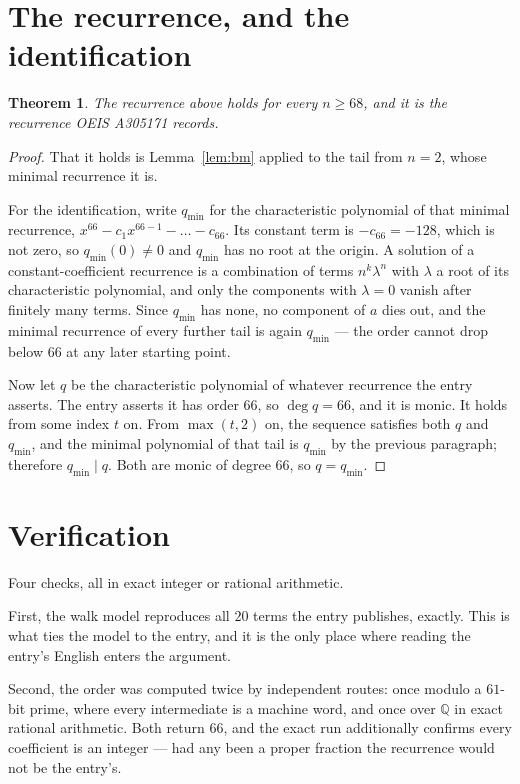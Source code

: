 \documentclass[11pt,a4paper]{article}
\theoremstyle{plain}
\newtheorem{theorem}{Theorem}
\theoremstyle{definition}
\begin{document}
\section{The recurrence, and the identification}

\begin{theorem}
The recurrence above holds for every $n\ge68$, and it is the recurrence OEIS A305171 records.
\end{theorem}

\begin{proof}
That it holds is Lemma~\ref{lem:bm} applied to the tail from $n=2$, whose minimal
recurrence it is.

For the identification, write $q_{\min}$ for the characteristic polynomial of that minimal
recurrence, $x^{66}-c_1x^{66-1}-\dots-c_{66}$. Its constant term is
$-c_{66}=-128$, which is not zero, so $q_{\min}(0)\neq0$ and $q_{\min}$ has no
root at the origin. A solution of a constant-coefficient recurrence is a combination of terms
$n^{k}\lambda^{n}$ with $\lambda$ a root of its characteristic polynomial, and only the
components with $\lambda=0$ vanish after finitely many terms. Since $q_{\min}$ has none, no
component of $a$ dies out, and the minimal recurrence of every further tail is again
$q_{\min}$ --- the order cannot drop below $66$ at any later starting point.

Now let $q$ be the characteristic polynomial of whatever recurrence the entry asserts. The
entry asserts it has order $66$, so $\deg q=66$, and it is monic. It holds from some
index $t$ on. From $\max(t,2)$ on, the sequence satisfies both $q$ and $q_{\min}$, and
the minimal polynomial of that tail is $q_{\min}$ by the previous paragraph; therefore
$q_{\min}\mid q$. Both are monic of degree $66$, so $q=q_{\min}$.
\end{proof}

\section{Verification}

Four checks, all in exact integer or rational arithmetic.

First, the walk model reproduces all $20$ terms the entry publishes, exactly. This is
what ties the model to the entry, and it is the only place where reading the entry's English
enters the argument.

Second, the order was computed twice by independent routes: once modulo a $61$-bit prime, where
every intermediate is a machine word, and once over $\mathbb{Q}$ in exact rational arithmetic.
Both return $66$, and the exact run additionally confirms every coefficient is an integer
--- had any been a proper fraction the recurrence would not be the entry's.
\end{document}
